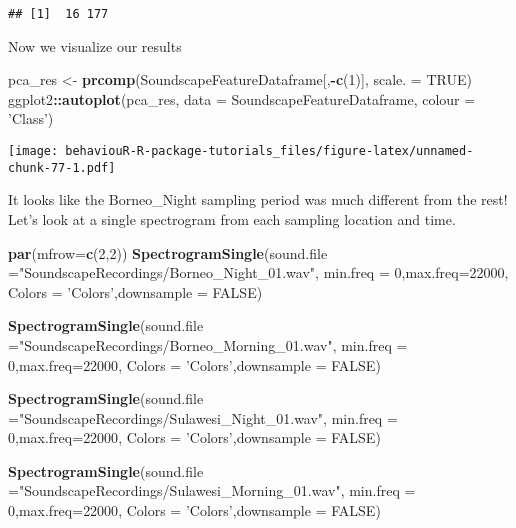 \documentclass[]{book}
\newenvironment{Shaded}{\begin{snugshade}}{\end{snugshade}}
\newcommand{\DataTypeTok}[1]{\textcolor[rgb]{0.13,0.29,0.53}{#1}}
\newcommand{\DecValTok}[1]{\textcolor[rgb]{0.00,0.00,0.81}{#1}}
\newcommand{\KeywordTok}[1]{\textcolor[rgb]{0.13,0.29,0.53}{\textbf{#1}}}
\newcommand{\NormalTok}[1]{#1}
\newcommand{\OperatorTok}[1]{\textcolor[rgb]{0.81,0.36,0.00}{\textbf{#1}}}
\newcommand{\OtherTok}[1]{\textcolor[rgb]{0.56,0.35,0.01}{#1}}
\newcommand{\StringTok}[1]{\textcolor[rgb]{0.31,0.60,0.02}{#1}}
\begin{document}
\begin{verbatim}
## [1]  16 177
\end{verbatim}

Now we visualize our results

\begin{Shaded}
\begin{Highlighting}[]
\NormalTok{pca_res <-}\StringTok{ }\KeywordTok{prcomp}\NormalTok{(SoundscapeFeatureDataframe[,}\OperatorTok{-}\KeywordTok{c}\NormalTok{(}\DecValTok{1}\NormalTok{)], }\DataTypeTok{scale. =} \OtherTok{TRUE}\NormalTok{)}
\NormalTok{ggplot2}\OperatorTok{::}\KeywordTok{autoplot}\NormalTok{(pca_res, }\DataTypeTok{data =}\NormalTok{ SoundscapeFeatureDataframe, }
         \DataTypeTok{colour =} \StringTok{'Class'}\NormalTok{)}
\end{Highlighting}
\end{Shaded}

\texttt{[image: behaviouR-R-package-tutorials\_files/figure-latex/unnamed-chunk-77-1.pdf]}

It looks like the Borneo\_Night sampling period was much different from the rest! Let's look at a single spectrogram from each sampling location and time.

\begin{Shaded}
\begin{Highlighting}[]
\KeywordTok{par}\NormalTok{(}\DataTypeTok{mfrow=}\KeywordTok{c}\NormalTok{(}\DecValTok{2}\NormalTok{,}\DecValTok{2}\NormalTok{))}
\KeywordTok{SpectrogramSingle}\NormalTok{(}\DataTypeTok{sound.file =}\StringTok{"SoundscapeRecordings/Borneo_Night_01.wav"}\NormalTok{,}
                  \DataTypeTok{min.freq =} \DecValTok{0}\NormalTok{,}\DataTypeTok{max.freq=}\DecValTok{22000}\NormalTok{,}
                  \DataTypeTok{Colors =} \StringTok{'Colors'}\NormalTok{,}\DataTypeTok{downsample =} \OtherTok{FALSE}\NormalTok{)}

\KeywordTok{SpectrogramSingle}\NormalTok{(}\DataTypeTok{sound.file =}\StringTok{"SoundscapeRecordings/Borneo_Morning_01.wav"}\NormalTok{,}
                  \DataTypeTok{min.freq =} \DecValTok{0}\NormalTok{,}\DataTypeTok{max.freq=}\DecValTok{22000}\NormalTok{,}
                  \DataTypeTok{Colors =} \StringTok{'Colors'}\NormalTok{,}\DataTypeTok{downsample =} \OtherTok{FALSE}\NormalTok{)}

\KeywordTok{SpectrogramSingle}\NormalTok{(}\DataTypeTok{sound.file =}\StringTok{"SoundscapeRecordings/Sulawesi_Night_01.wav"}\NormalTok{,}
                  \DataTypeTok{min.freq =} \DecValTok{0}\NormalTok{,}\DataTypeTok{max.freq=}\DecValTok{22000}\NormalTok{,}
                  \DataTypeTok{Colors =} \StringTok{'Colors'}\NormalTok{,}\DataTypeTok{downsample =} \OtherTok{FALSE}\NormalTok{)}

\KeywordTok{SpectrogramSingle}\NormalTok{(}\DataTypeTok{sound.file =}\StringTok{"SoundscapeRecordings/Sulawesi_Morning_01.wav"}\NormalTok{,}
                  \DataTypeTok{min.freq =} \DecValTok{0}\NormalTok{,}\DataTypeTok{max.freq=}\DecValTok{22000}\NormalTok{,}
                  \DataTypeTok{Colors =} \StringTok{'Colors'}\NormalTok{,}\DataTypeTok{downsample =} \OtherTok{FALSE}\NormalTok{)}
\end{Highlighting}
\end{Shaded}
\end{document}
